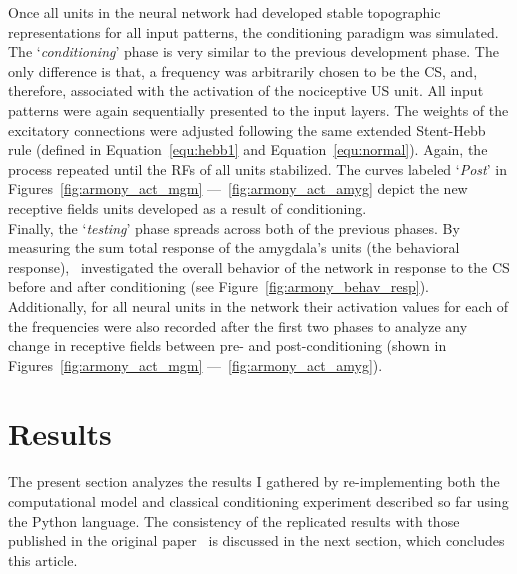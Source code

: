 Once all units in the neural network had developed stable topographic representations for all input patterns, the conditioning paradigm was simulated. The `\emph{conditioning}' phase is very similar to the previous development phase. The only difference is that, a frequency was arbitrarily chosen to be the CS, and, therefore, associated with the activation of the nociceptive US unit. All input patterns were again sequentially presented to the input layers. The weights of the excitatory connections were adjusted following the same extended Stent-Hebb rule (defined in Equation~\ref{equ:hebb1} and Equation~\ref{equ:normal}). Again, the process repeated until the RFs of all units stabilized. The curves labeled `\emph{Post}' in Figures~\ref{fig:armony_act_mgm} ---~\ref{fig:armony_act_amyg} depict the new receptive fields units developed as a result of conditioning.\\

Finally, the `\emph{testing}' phase spreads across both of the previous phases. By measuring the sum total response of the amygdala's units (the behavioral response),~\citet{Armony1995} investigated the overall behavior of the network in response to the CS before and after conditioning (see Figure~\ref{fig:armony_behav_resp}). Additionally, for all neural units in the network their activation values for each of the frequencies  were also recorded after the first two phases to analyze any change in receptive fields between pre- and post-conditioning (shown in Figures~\ref{fig:armony_act_mgm} ---~\ref{fig:armony_act_amyg}).

\section{Results}
The present section analyzes the results I gathered by re-implementing both the computational model and classical conditioning experiment described so far using the Python language. The consistency of the replicated results with those published in the original paper~\supercite{Armony1995} is discussed in the next section, which concludes this article.\\

